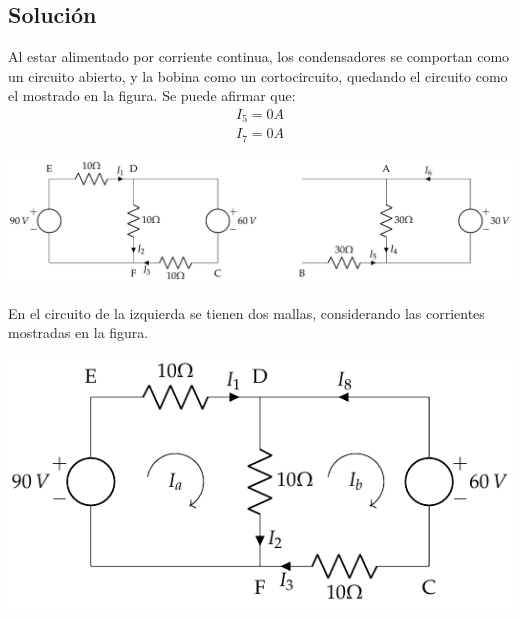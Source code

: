 \subsection*{Solución}
Al estar alimentado por corriente continua, los condensadores se
comportan como un circuito abierto, y la bobina como un cortocircuito,
quedando el circuito como el mostrado en la figura. Se puede afirmar
que:
\begin{align*}
  {I_5=0A}\\
  {I_7=0A}
\end{align*}

\begin{center}
  \includegraphics[width=\linewidth]{figuras/BT1_10_mod.pdf}
\end{center}

En el circuito de la izquierda se tienen dos mallas, considerando las
corrientes mostradas en la figura.

\begin{center}
  \includegraphics{figuras/BT1_10_izq_mallas.pdf}
\end{center}

